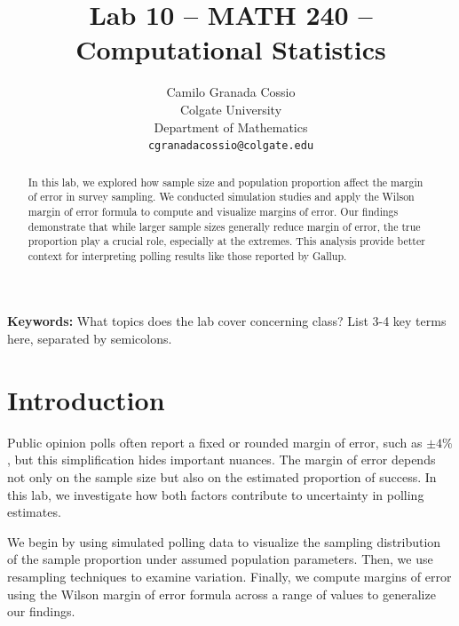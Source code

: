 \documentclass{article}\usepackage[]{graphicx}\usepackage[]{xcolor}
\begin{document}
\vspace{-1in}
\title{Lab 10 -- MATH 240 -- Computational Statistics}

\author{
  Camilo Granada Cossio \\
  Colgate University  \\
  Department of Mathematics  \\
  {\tt cgranadacossio@colgate.edu}
}

\date{}

\maketitle

\begin{multicols}{2}
\begin{abstract}

In this lab, we explored how sample size and population proportion affect the margin of error in survey sampling. We conducted simulation studies and apply the Wilson margin of error formula to compute and visualize margins of error. Our findings demonstrate that while larger sample sizes generally reduce margin of error, the true proportion play a crucial role, especially at the extremes. This analysis provide better context for interpreting polling results like those reported by Gallup.

\end{abstract}

\noindent \textbf{Keywords:} What topics does the lab cover concerning class? List 3-4 key terms here, separated by semicolons.

\section{Introduction}

Public opinion polls often report a fixed or rounded margin of error, such as  $\pm 4\%$, but this simplification hides important nuances. The margin of error depends not only on the sample size but also on the estimated proportion of success. In this lab, we investigate how both factors contribute to uncertainty in polling estimates.

We begin by using simulated polling data to visualize the sampling distribution of the sample proportion under assumed population parameters. Then, we use resampling techniques to examine variation. Finally, we compute margins of error using the Wilson margin of error formula across a range of values to generalize our findings.


\end{multicols}
\end{document}
